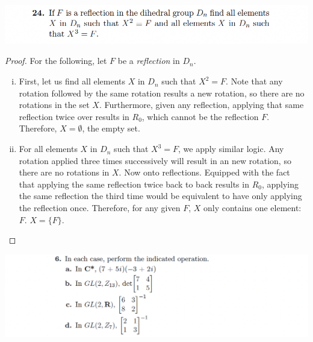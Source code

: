 \documentclass[12pt]{scrartcl}
\begin{document}
\newpage 

\includegraphics[width=14cm]{24.png}

\begin{proof}
  For the following, let $F$ be a \textit{reflection} in $D_n$.
  \begin{enumerate}[(i)]
    \item First, let us find all elements $X$ in $D_n$ such that $X^2 = F$. Note that any rotation followed by the same rotation results a new rotation, so there are 
    no rotations in the set $X$. Furthermore, given any reflection, applying that same reflection twice over results in $R_0$, which 
    cannot be the reflection $F$. Therefore, $X = \emptyset$, the empty set.
    \item For all elements $X$ in $D_n$ such that $X^3 = F$, we apply similar logic. Any rotation applied three 
    times successively will result in an new rotation, so there are no rotations in $X$. Now onto reflections. 
    Equipped with the fact that applying the same reflection twice back to back results in $R_0$, applying the same reflection 
    the third time would be equivalent to have only applying the reflection once. Therefore, for any given $F$, $X$ only 
    contains one element: $F$. $X = \{F\}$.
  \end{enumerate}
\end{proof}

\newpage 

\includegraphics[width=14cm]{6.png}
\end{document}
